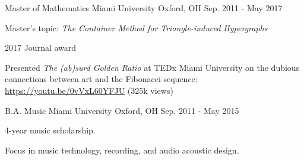 

\begin{cventries}

  \cventry
    {Master of Mathematics} %
    {Miami University} %
    {Oxford, OH} %
    {Sep. 2011 - May 2017} %
    {
      \begin{cvitems} %
        \item {Master's topic: {\it The Container Method for Triangle-induced Hypergraphs}}
        \item {2017 Journal award}
        \item {
          Presented {\it The (ab)surd Golden Ratio} at TEDx Miami
          University on the dubious connections between art and the
          Fibonacci sequence: \url{https://youtu.be/0vVxL60YFJU} (325k views)
        }
      \end{cvitems}
    }

  \cventry
    {B.A. Music} %
    {Miami University} %
    {Oxford, OH} %
    {Sep. 2011 - May 2015} %
    {
      \begin{cvitems} %
        \item {4-year music scholarship.}
        \item {Focus in music technology, recording, and audio acoustic design.}
      \end{cvitems}
    }
\end{cventries}

